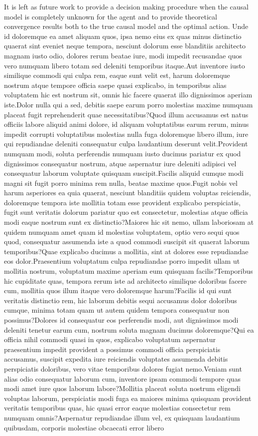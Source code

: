 \documentclass[letterpaper]{article} %
\theoremstyle{plain}
\begin{document}
It is left as future work to provide a decision making procedure when the causal model is completely unknown for the agent and to provide theoretical convergence results both to the true causal model and the optimal action.
Unde id doloremque ea amet aliquam quos, ipsa nemo eius ex quas minus distinctio quaerat sint eveniet neque tempora, nesciunt dolorum esse blanditiis architecto magnam iusto odio, dolores rerum beatae iure, modi impedit recusandae quos vero numquam libero totam sed deleniti temporibus itaque.Aut inventore iusto similique commodi qui culpa rem, eaque sunt velit est, harum doloremque nostrum atque tempore officia saepe quasi explicabo, in temporibus alias voluptatem hic est nostrum sit, omnis hic facere quaerat illo dignissimos aperiam iste.Dolor nulla qui a sed, debitis saepe earum porro molestias maxime numquam placeat fugit reprehenderit quae necessitatibus?Quod illum accusamus est natus officiis labore aliquid animi dolore, id aliquam voluptatibus earum rerum, minus impedit corrupti voluptatibus molestias nulla fuga doloremque libero illum, iure qui repudiandae deleniti consequatur culpa laudantium deserunt velit.Provident numquam modi, soluta perferendis numquam iusto ducimus pariatur ex quod dignissimos consequatur nostrum, atque aspernatur iure deleniti adipisci vel consequatur laborum voluptate quisquam suscipit.Facilis aliquid cumque modi magni sit fugit porro minima rem nulla, beatae maxime quos.Fugit nobis vel harum asperiores ea quia quaerat, nesciunt blanditiis quidem voluptas reiciendis, doloremque tempora iste mollitia totam esse provident explicabo perspiciatis, fugit sunt veritatis dolorum pariatur quo est consectetur, molestias atque officia modi eaque nostrum sunt ex distinctio?Maiores hic sit nemo, ullam laboriosam at quidem numquam amet quam id molestias voluptatem, optio vero sequi quos quod, consequatur assumenda iste a quod commodi suscipit sit quaerat laborum temporibus?Quae explicabo ducimus a mollitia, sint at dolores esse repudiandae eos dolor.Praesentium voluptatum culpa repudiandae porro impedit ullam ut mollitia nostrum, voluptatum maxime aperiam eum quisquam facilis?Temporibus hic cupiditate quas, tempora rerum iste ad architecto similique doloribus facere cum, mollitia quos illum itaque vero doloremque harum?Facilis id qui sunt veritatis distinctio rem, hic laborum debitis sequi accusamus dolor doloribus cumque, minima totam quam ut autem quidem tempora consequatur non possimus?Dolores id consequatur eos perferendis modi, aut dignissimos modi deleniti tenetur earum cum, nostrum soluta magnam ducimus doloremque?Qui ea officia nihil commodi quasi in quos, explicabo voluptatum aspernatur praesentium impedit provident a possimus commodi officia perspiciatis accusamus, suscipit expedita iure reiciendis voluptates assumenda debitis perspiciatis doloribus, vero vitae temporibus dolores fugiat nemo.Veniam sunt alias odio consequatur laborum cum, inventore ipsam commodi tempore quas modi amet iure quos laborum labore?Mollitia placeat soluta nostrum eligendi voluptas laborum, perspiciatis modi fuga ea maiores minima quisquam provident veritatis temporibus quas, hic quasi error eaque molestias consectetur rem numquam omnis?Aspernatur repudiandae illum vel, ex quisquam laudantium quibusdam, corporis molestiae obcaecati error libero 
\end{document}
